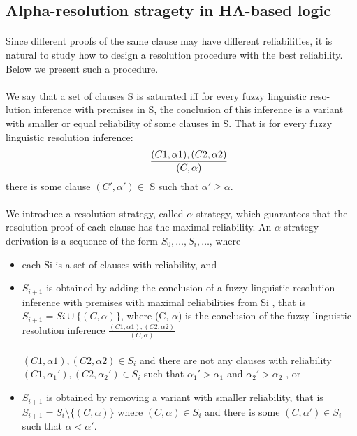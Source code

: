 \documentclass[part1.tex]{subfiles}
\begin{document}
\subsection{Alpha-resolution stragety in HA-based logic}
\paragraph{} Since different proofs of the same clause may have different reliabilities, 
it is natural to study how to design a resolution procedure with the best reliability. 
Below we present such a procedure.
\paragraph{} 
We say that a set of clauses S is saturated iff for every fuzzy linguistic reso-
lution inference with premises in S, the conclusion of this inference is a variant
with smaller or equal reliability of some clauses in S. That is for every fuzzy
linguistic resolution inference:\\
\[\indent \frac{(C1, \alpha1), (C2, \alpha2)}{(C,\alpha)}
\]
\indent there is some clause \((C',\alpha') \in \) S such that \(\alpha' \ge \alpha\).
\paragraph{} 
We introduce a resolution strategy, called $\alpha$-strategy, which guarantees that
the resolution proof of each clause has the maximal reliability. An $\alpha$-strategy
derivation is a sequence of the form $S_{0},\ldots,S_{i},\ldots$, where
\begin{itemize} 
	\item each Si is a set of clauses with reliability, and
	\item  \(S_{i+1}\) is obtained by adding the conclusion of a fuzzy 
	linguistic resolution inference with premises with maximal reliabilities 
	from Si , that is \(S_{i+1} = Si \cup \{(C, \alpha)\}\), 
	where (C, $\alpha$) is the conclusion of the fuzzy linguistic resolution inference  
	\(\frac{(C1 , \alpha1), (C2 , \alpha2)}	{(C, \alpha)}\)
	\\\\	
	$(C1 , \alpha1 ), (C2 , \alpha2 ) \in S_{i}$ and there are not any clauses 
	with reliability $(C1 , \alpha_{1}' ), (C2 , \alpha_{2}' ) \in S_{i}$ such that
			$\alpha_{1}' > \alpha_{1}$ and $\alpha_{2}' > \alpha_{2}$ , or

		\item $S_{i+1}$ is obtained by removing a variant with smaller 
			reliability, that is $S_{i+1} = S_{i} \setminus \{(C, \alpha)\}$ 
			where $(C, \alpha) \in S_{i}$ and there is some
			$(C, \alpha') \in S_{i}$ such that $\alpha < \alpha'$.
\end{itemize}
\end{document}
